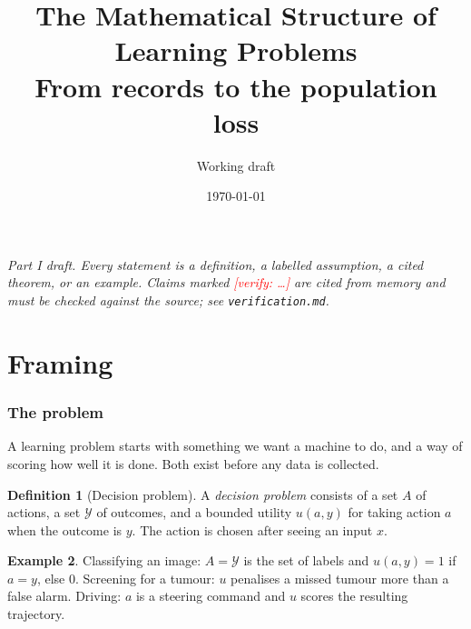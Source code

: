 \documentclass[11pt]{article}
\title{\textbf{The Mathematical Structure of Learning Problems}\\[6pt]
\large From records to the population loss}
\author{Working draft}
\date{\today}
\theoremstyle{definition}
\newtheorem{definition}{Definition}[section]
\newtheorem{example}[definition]{Example}
\theoremstyle{plain}
\theoremstyle{remark}
\newcommand{\verify}[1]{\textcolor{red}{[verify: #1]}}
\newcommand{\Y}{\mathcal{Y}}
\begin{document}
\maketitle

\noindent\emph{Part I draft. Every statement is a definition, a labelled
assumption, a cited theorem, or an example. Claims marked
\verify{\dots} are cited from memory and must be checked against the
source; see \texttt{verification.md}.}

\part{Framing}

\section{The problem}\label{sec:problem}

A learning problem starts with something we want a machine to do, and
a way of scoring how well it is done. Both exist before any data is
collected.

\begin{definition}[Decision problem]
A \emph{decision problem} consists of a set $A$ of actions, a set $\Y$
of outcomes, and a bounded utility $u(a,y)$ for taking action $a$ when
the outcome is $y$. The action is chosen after seeing an input $x$.
\end{definition}

\begin{example}
Classifying an image: $A=\Y$ is the set of labels and $u(a,y)=1$ if
$a=y$, else $0$. Screening for a tumour: $u$ penalises a missed tumour
more than a false alarm. Driving: $a$ is a steering command and $u$
scores the resulting trajectory.
\end{example}
\end{document}
